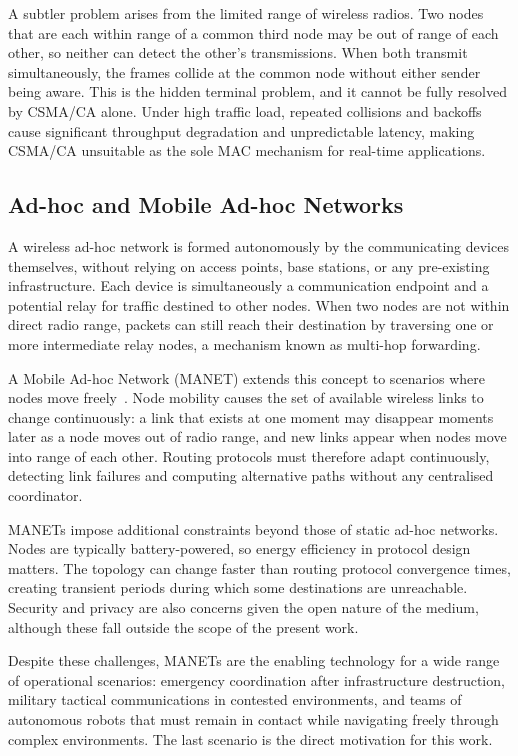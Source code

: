 A subtler problem arises from the limited range of wireless radios. Two nodes
that are each within range of a common third node may be out of range of each
other, so neither can detect the other's transmissions. When both transmit
simultaneously, the frames collide at the common node without either sender
being aware. This is the hidden terminal problem, and it cannot be fully
resolved by CSMA/CA alone. Under high traffic load, repeated collisions and
backoffs cause significant throughput degradation and unpredictable latency,
making CSMA/CA unsuitable as the sole MAC mechanism for real-time
applications.

\subsection{Ad-hoc and Mobile Ad-hoc Networks}

A wireless ad-hoc network is formed autonomously by the communicating devices
themselves, without relying on access points, base stations, or any
pre-existing infrastructure. Each device is simultaneously a communication
endpoint and a potential relay for traffic destined to other nodes. When two
nodes are not within direct radio range, packets can still reach their
destination by traversing one or more intermediate relay nodes, a mechanism
known as multi-hop forwarding.

A Mobile Ad-hoc Network (MANET) extends this concept to scenarios where nodes
move freely~\cite{conti2014mobile}. Node mobility causes the set of available
wireless links to change continuously: a link that exists at one moment may
disappear moments later as a node moves out of radio range, and new links
appear when nodes move into range of each other. Routing protocols must
therefore adapt continuously, detecting link failures and computing alternative
paths without any centralised coordinator.

MANETs impose additional constraints beyond those of static ad-hoc networks.
Nodes are typically battery-powered, so energy efficiency in protocol design
matters. The topology can change faster than routing protocol convergence
times, creating transient periods during which some destinations are
unreachable. Security and privacy are also concerns given the open nature of
the medium, although these fall outside the scope of the present work.

Despite these challenges, MANETs are the enabling technology for a wide range
of operational scenarios: emergency coordination after infrastructure
destruction, military tactical communications in contested environments, and
teams of autonomous robots that must remain in contact while navigating freely
through complex environments. The last scenario is the direct motivation for
this work.

